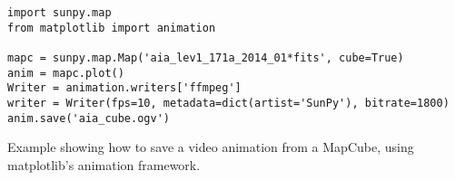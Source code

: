 \begin{listing}[h]
\begin{verbatim}
import sunpy.map
from matplotlib import animation

mapc = sunpy.map.Map('aia_lev1_171a_2014_01*fits', cube=True)
anim = mapc.plot()
Writer = animation.writers['ffmpeg']
writer = Writer(fps=10, metadata=dict(artist='SunPy'), bitrate=1800)
anim.save('aia_cube.ogv')
\end{verbatim}
\caption{Example showing how to save a video animation from a MapCube, using 
matplotlib's animation framework.}
\label{code:mapcube_2}
\end{listing}